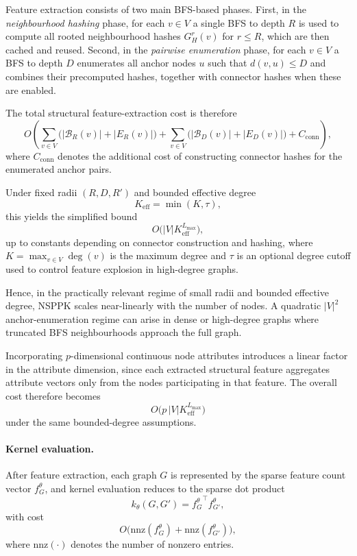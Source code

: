 Feature extraction consists of two main BFS-based phases.
First, in the \emph{neighbourhood hashing} phase, for each $v\in V$ a single BFS
to depth $R$ is used to compute all rooted neighbourhood hashes $G_H^r(v)$ for
$r\le R$, which are then cached and reused.
Second, in the \emph{pairwise enumeration} phase, for each $v\in V$ a BFS to
depth $D$ enumerates all anchor nodes $u$ such that $d(v,u)\le D$ and combines
their precomputed hashes, together with connector hashes when these are enabled.

The total structural feature-extraction cost is therefore
\[
O\!\left(
\sum_{v\in V}\bigl(|\mathcal{B}_R(v)|+|E_R(v)|\bigr)
+
\sum_{v\in V}\bigl(|\mathcal{B}_D(v)|+|E_D(v)|\bigr)
+
C_{\mathrm{conn}}
\right),
\]
where $C_{\mathrm{conn}}$ denotes the additional cost of constructing connector
hashes for the enumerated anchor pairs.

Under fixed radii $(R,D,R')$ and bounded effective degree
\[
K_{\mathrm{eff}}=\min(K,\tau),
\]
this yields the simplified bound
\[
O\bigl(|V|K_{\mathrm{eff}}^{L_{\max}}\bigr),
\]
up to constants depending on connector construction and hashing, where
$K=\max_{v\in V}\deg(v)$ is the maximum degree and $\tau$ is an optional degree
cutoff used to control feature explosion in high-degree graphs.

Hence, in the practically relevant regime of small radii and bounded effective
degree, NSPPK scales near-linearly with the number of nodes. A quadratic
$|V|^2$ anchor-enumeration regime can arise in dense or high-degree graphs where
truncated BFS neighbourhoods approach the full graph.

Incorporating $p$-dimensional continuous node attributes introduces a linear
factor in the attribute dimension, since each extracted structural feature
aggregates attribute vectors only from the nodes participating in that feature.
The overall cost therefore becomes
\[
O\bigl(p\,|V|K_{\mathrm{eff}}^{L_{\max}}\bigr)
\]
under the same bounded-degree assumptions.

\paragraph{Kernel evaluation.}
After feature extraction, each graph $G$ is represented by the sparse feature
count vector $f_G^\theta$, and kernel evaluation reduces to the sparse dot product
\[
k_\theta(G,G') = {f_G^\theta}^{\top} f_{G'}^\theta,
\]
with cost
\[
O\!\bigl(\mathrm{nnz}(f_G^\theta)+\mathrm{nnz}(f_{G'}^\theta)\bigr),
\]
where $\mathrm{nnz}(\cdot)$ denotes the number of nonzero entries.

